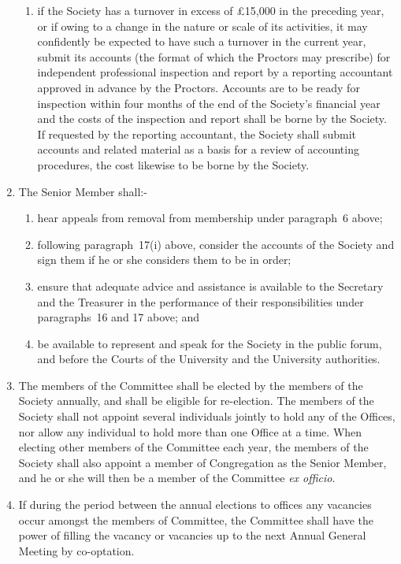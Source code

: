 \documentclass[11pt]{article}
\begin{document}
\begin{enumerate}
\begin{enumerate}
\item if the Society has a turnover in excess of \pounds 15,000 in the preceding year, or if owing to a change in the nature or scale of its activities, it may confidently be expected to have such a turnover in the current year, submit its accounts (the format of which the Proctors may prescribe) for independent professional inspection and report by a reporting accountant approved in advance by the Proctors. Accounts are to be ready for inspection within four months of the end of the Society's financial year and the costs of the inspection and report shall be borne by the Society. If requested by the reporting accountant, the Society shall submit accounts and related material as a basis for a review of accounting procedures, the cost likewise to be borne by the Society.
\end{enumerate}
\item The Senior Member shall:-
\begin{enumerate}
\item hear appeals from removal from membership under paragraph~6 above;
\item following paragraph~17(i) above, consider the accounts of the Society and sign them if he or she considers them to be in order;
\item ensure that adequate advice and assistance is available to the Secretary and the Treasurer in the performance of their responsibilities under paragraphs~16 and 17 above; and
\item be available to represent and speak for the Society in the public forum, and before the Courts of the University and the University authorities.
\end{enumerate}
\item The members of the Committee shall be elected by the members of the Society annually, and shall be eligible for re-election. The members of the Society shall not appoint several individuals jointly to hold any of the Offices, nor allow any individual to hold more than one Office at a time. When electing other members of the Committee each year, the members of the Society shall also appoint a member of Congregation as the Senior Member, and he or she will then be a member of the Committee \emph{ex officio}.
\item If during the period between the annual elections to offices any vacancies occur amongst the members of Committee, the Committee shall have the power of filling the vacancy or vacancies up to the next Annual General Meeting by co-optation.

\end{enumerate}
\end{document}
